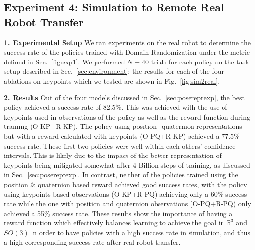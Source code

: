 \documentclass[letterpaper, 10 pt, conference]{ieeeconf}  %
\newcommand{\secref}[1]{Sec.~\ref{#1}}
\newcommand{\figref}[1]{Fig.~\ref{#1}}
\begin{document}
\vspace{-3pt}
\subsection{Experiment 4: Simulation to Remote Real Robot Transfer}
\vspace{-3pt}


\noindent \textbf{1. Experimental Setup} We ran experiments on the real robot to determine the success rate of the policies trained with Domain Randomization under the metric defined in \secref{fig:exp1}. We performed $N=40$ trials for each policy on the task setup described in \secref{sec:environment}; the results for each of the four ablations on keypoints which we tested are shown in \figref{fig:sim2real}.

\noindent \textbf{2. Results} Out of the four models discussed in \secref{sec:posereprexp}, the best policy achieved a success rate of 82.5\%. This was achieved with the use of keypoints used in observations of the policy as well as the reward function during training (O-KP+R-KP).    The policy using position+quaternion representations but with a reward calculated with keypoints (O-PQ+R-KP) achieved a 77.5\% success rate. These first two policies were well within each others' confidence intervals. This is likely due to the impact of the better representation of keypoints being mitigated somewhat after 4 Billion steps of training, as discussed in \secref{sec:posereprexp}. In contrast, neither of the policies trained using the position \& quaternion based reward achieved good success rates, with the policy using keypoints-based observations (O-KP+R-PQ) achieving only a 60\% success rate while the one with position and quaternion observations (O-PQ+R-PQ) only achieved a 55\% success rate. These results show the importance of having a reward function which effectively balances learning to achieve the goal in $\mathbb R^3$ and $SO(3)$ in order to have policies with a high success rate in simulation, and thus a high corresponding success rate after real robot transfer.
\end{document}
